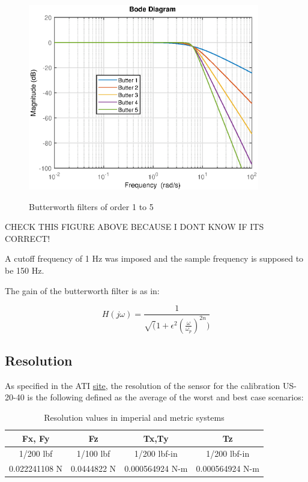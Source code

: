 \documentclass[a4paper]{article}
\begin{document}
\begin{figure}[h!]
	\centering
	\includegraphics[width=0.9\textwidth]{Images/butter_filters.eps}
	\label{fig:butter}
	\caption{Butterworth filters of order 1 to 5}
\end{figure}

CHECK THIS FIGURE ABOVE BECAUSE I DONT KNOW IF ITS CORRECT!

A cutoff frequency of 1 Hz was imposed and the sample frequency is supposed to be 150 Hz. 


The gain of the butterworth filter is as in:

\begin{equation}
	H(j\omega) = \frac{1}{\sqrt(1 + \epsilon^2(\frac{\omega}{\omega_p})^{2n})}
\end{equation}

\subsection{Resolution}
As specified in the ATI \hyperref{https://www.ati-ia.com/products/ft/ft_models.aspx?id=mini40}{category}{name}{site}, the resolution of the sensor for the calibration US-20-40 is the following defined as the average of the worst and best case
scenarios:

\begin{table}[h!]
	\centering
	\caption{Resolution values in imperial and metric systems\label{tab:resolution}}
	\begin{tabular}{||c | c | c | c||} 
		\hline
		Fx, Fy & Fz & Tx,Ty & Tz \\ [0.5ex] 
		\hline\hline
		1/200 lbf & 1/100 lbf & 1/200 lbf-in & 1/200 lbf-in\\ 
		\hline
		0.022241108 N & 0.0444822 N & 0.000564924 N-m & 0.000564924 N-m \\
		\hline
	\end{tabular}
\end{table}
\end{document}
